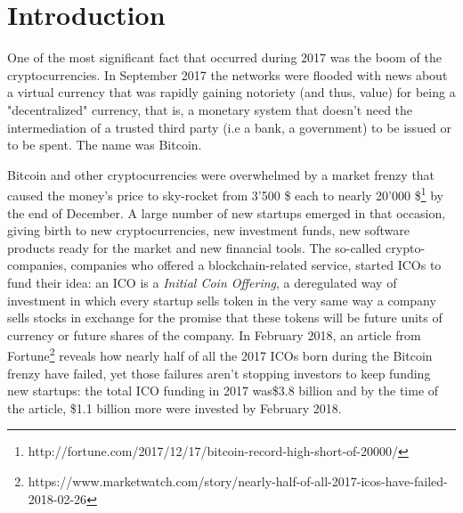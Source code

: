
	\chapter{Introduction}
		One of the most significant fact that occurred during 2017 was the boom of the cryptocurrencies. In September 2017 the networks were flooded with news about a virtual currency that was rapidly gaining notoriety (and thus, value) for being a "decentralized" currency, that is, a monetary system that doesn't need the intermediation of a trusted third party (i.e a bank, a government) to be issued or to be spent. The name was Bitcoin.
		
		Bitcoin and other cryptocurrencies were overwhelmed by a market frenzy that caused the money's price to sky-rocket from 3'500 \$ each to nearly 20'000 \$\footnote{http://fortune.com/2017/12/17/bitcoin-record-high-short-of-20000/} by the end of December. A large number of new startups emerged in that occasion, giving birth to new cryptocurrencies, new investment funds, new software products ready for the market and new financial tools. The so-called crypto-companies, companies who offered a blockchain-related service, started ICOs to fund their idea: an ICO is a \textit{Initial Coin Offering}, a deregulated way of investment in which every startup sells token in the very same way a company sells stocks in exchange for the promise that these tokens will be future units of currency or future shares of the company. In February 2018, an article from Fortune\footnote{https://www.marketwatch.com/story/nearly-half-of-all-2017-icos-have-failed-2018-02-26} reveals how nearly half of all the 2017 ICOs born during the Bitcoin frenzy have failed, yet those failures aren't stopping investors to keep funding new startups: the total ICO funding in 2017 was\$3.8 billion and by the time of the article, \$1.1 billion more were invested by February 2018.
		
